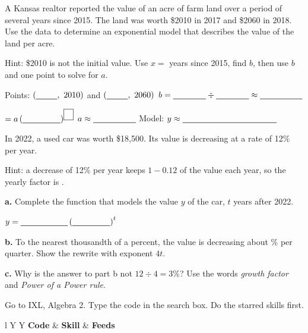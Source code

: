 \newpage

A Kansas realtor reported the value of an acre of farm land over a period of several years since 2015. The land was worth \$2010 in 2017 and \$2060 in 2018. Use the data to determine an exponential model that describes the value of the land per acre.

Hint: \$2010 is not the initial value. Use $x=$ years since 2015, find $b$, then use $b$ and one point to solve for $a$.

\vspace{2pt}
Points: $\left(\blank[0.9cm],\ 2010\right)$ and $\left(\blank[0.9cm],\ 2060\right)$ \qquad $b=\blank[1.4cm]\div\blank[1.4cm]\approx\blank[1.8cm]$

\blank[1.4cm] $=a\left(\blank[1.6cm]\right)^{\boxed{\phantom{0}}}$ \qquad $a\approx\blank[1.8cm]$ \qquad Model: $y\approx\blank[4cm]$\lines[2]

In 2022, a used car was worth \$18,500. Its value is decreasing at a rate of 12\% per year.

Hint: a decrease of 12\% per year keeps $1-0.12$ of the value each year, so the yearly factor is \blank[1.4cm].

\textbf{a.} Complete the function that models the value $y$ of the car, $t$ years after 2022.

\qquad $y=\blank[2cm]\left(\blank[1.6cm]\right)^t$

\textbf{b.} To the nearest thousandth of a percent, the value is decreasing about \blank[1.8cm]\% per quarter. Show the rewrite with exponent $4t$.\lines[2]

\textbf{c.} Why is the answer to part b not $12\div4=3\%$? Use the words \emph{growth factor} and \emph{Power of a Power rule}.\lines[2]

\newpage
{}
Go to IXL, Algebra 2. Type the code in the search box. Do the starred skills first.

\vspace{2pt}
\begin{tabularx}{\textwidth}{l Y Y}
\toprule
\textbf{Code} & \textbf{Skill} & \textbf{Feeds} \\
\midrule
{}
\bottomrule
\end{tabularx}

